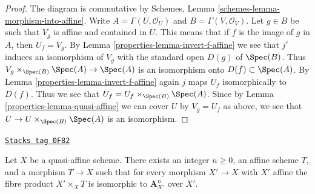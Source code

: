 \begin{proof}

The diagram is commutative by Schemes, Lemma
\ref{schemes-lemma-morphism-into-affine}.
Write $A = \Gamma(U, \mathcal{O}_U)$ and $B = \Gamma(V, \mathcal{O}_V)$. Let
$g \in B$ be such that $V_g$ is affine and contained in $U$. This
means that if $f$ is the image of $g$ in $A$, then $U_f = V_g$. By Lemma
\ref{properties-lemma-invert-f-affine} we see that $j'$ induces an isomorphism of
$V_g$ with the standard open $D(g)$ of $\Spec(B)$. Thus
$V_g \times_{\Spec(B)} \Spec(A) \to \Spec(A)$ is an
isomorphism onto $D(f) \subset \Spec(A)$. By Lemma \ref{properties-lemma-invert-f-affine}
again $j$ maps $U_f$ isomorphically to $D(f)$. Thus we see that
$U_f = U_f \times_{\Spec(B)} \Spec(A)$. Since by
Lemma \ref{properties-lemma-quasi-affine} we can cover $U$ by $V_g = U_f$ as above,
we see that $U \to U \times_{\Spec(B)} \Spec(A)$ is an isomorphism.
\end{proof}

\begin{lemma}
\label{properties-lemma-quasi-affine-presentation}
\href{https://stacks.math.columbia.edu/tag/0F82}{\texttt{Stacks tag 0F82}}

Let $X$ be a quasi-affine scheme. There exists an integer $n \geq 0$,
an affine scheme $T$, and a morphism $T \to X$ such that for every
morphism $X' \to X$ with $X'$ affine the fibre product $X' \times_X T$
is isomorphic to $\mathbf{A}^n_{X'}$ over $X'$.
\end{lemma}

